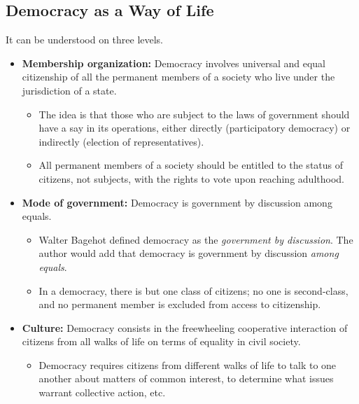 \documentclass[letterpaper]{article}
\begin{document}
\subsection*{Democracy as a Way of Life}
It can be understood on three levels.
\begin{itemize}
    \item \textbf{Membership organization:} Democracy involves universal and equal citizenship of all the permanent members of a society who live under the jurisdiction of a state.
    \begin{itemize}
        \item The idea is that those who are subject to the laws of government should have a say in its operations, either directly (participatory democracy) or indirectly (election of representatives).
        \item All permanent members of a society should be entitled to the status of citizens, not subjects, with the rights to vote upon reaching adulthood. 
    \end{itemize}
    \item \textbf{Mode of government:} Democracy is government by discussion among equals.
    \begin{itemize}
        \item Walter Bagehot defined democracy as the \emph{government by discussion}. The author would add that democracy is government by discussion \emph{among equals}. 
        \item In a democracy, there is but one class of citizens; no one is second-class, and no permanent member is excluded from access to citizenship. 
    \end{itemize}
    \item \textbf{Culture:} Democracy consists in the freewheeling cooperative interaction of citizens from all walks of life on terms of equality in civil society.
    \begin{itemize}
        \item Democracy requires citizens from different walks of life to talk to one another about matters of common interest, to determine what issues warrant collective action, etc. 
    \end{itemize}
\end{itemize}
\end{document}
